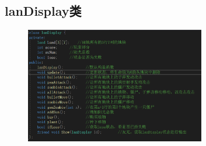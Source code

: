 \documentclass[12pt,a4paper,UTF8]{article}
\begin{document}
    \subsection{lanDisplay类}
    \begin{figure}[H]
      \centering
    \includegraphics[width=0.7\textwidth]{figure/lanDis.png}
    \end{figure}
\end{document}
